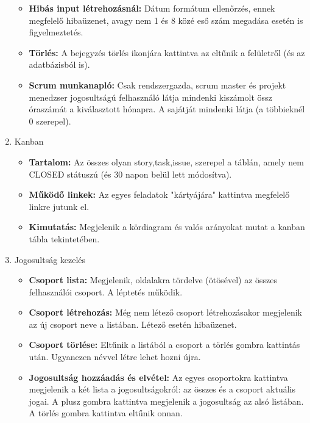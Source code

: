 \begin{enumerate}
\begin{itemize}
		\item \textbf{Hibás input létrehozásnál:} Dátum formátum ellenőrzés, ennek megfelelő hibaüzenet, avagy nem 1 és 8 közé eső szám megadása esetén is figyelmeztetés.
		\item \textbf{Törlés:} A bejegyzés törlés ikonjára kattintva az eltűnik a felületről (és az adatbázisból is).
		\item \textbf{Scrum munkanapló:} Csak rendszergazda, scrum master és projekt menedzser jogosultságú felhasználó látja mindenki kiszámolt össz óraszámát a kiválasztott hónapra. A sajátját mindenki látja (a többieknél 0 szerepel).
	\end{itemize}
	\item Kanban
	\begin{itemize}
		\item \textbf{Tartalom:} Az összes olyan story,task,issue, szerepel a táblán, amely nem CLOSED státuszú (és 30 napon belül lett módosítva).
		\item \textbf{Működő linkek:} Az egyes feladatok "kártyájára" kattintva megfelelő linkre jutunk el.
		\item \textbf{Kimutatás:} Megjelenik a kördiagram és valós arányokat mutat a kanban tábla tekintetében.
	\end{itemize}
	\item Jogosultság kezelés
	\begin{itemize}
		\item \textbf{Csoport lista:} Megjelenik, oldalakra tördelve (ötösével) az összes felhasználói csoport. A léptetés működik.
		\item \textbf{Csoport létrehozás:} Még nem létező csoport létrehozásakor megjelenik az új csoport neve a listában. Létező esetén hibaüzenet.
		\item \textbf{Csoport törlése:} Eltűnik a listából a csoport a törlés gombra kattintás után. Ugyanezen névvel létre lehet hozni újra.
		\item \textbf{Jogosultság hozzáadás és elvétel:} Az egyes csoportokra kattintva megjelenik a két lista a jogosultságokról: az összes és a csoport aktuális jogai. A plusz gombra kattintva megjelenik a jogosultság az alsó listában. A törlés gombra kattintva eltűnik onnan.
	\end{itemize}
\end{enumerate}